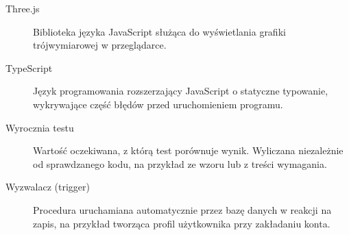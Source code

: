 \begin{description}
\item[Three.js] Biblioteka języka JavaScript służąca do wyświetlania grafiki trójwymiarowej w przeglądarce.

\item[TypeScript] Język programowania rozszerzający JavaScript o statyczne typowanie, wykrywające część błędów przed uruchomieniem programu.

\item[Wyrocznia testu] Wartość oczekiwana, z którą test porównuje wynik. Wyliczana niezależnie od sprawdzanego kodu, na przykład ze wzoru lub z treści wymagania.

\item[Wyzwalacz (trigger)] Procedura uruchamiana automatycznie przez bazę danych w reakcji na zapis, na przykład tworząca profil użytkownika przy zakładaniu konta.

\end{description}
